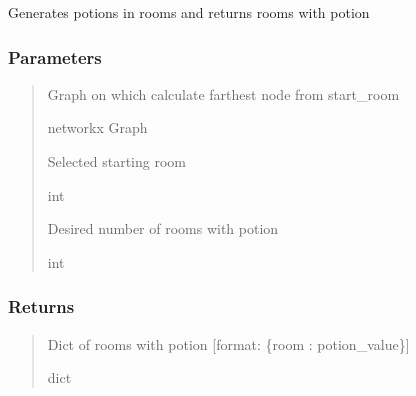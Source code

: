 \documentclass[letterpaper,10pt,english]{sphinxmanual}
\begin{document}
\begin{fulllineitems}
\label{\detokenize{api_reference/dungeon_resolver/generate_dungeon_problem:generate_dungeon_problem.generate_potions}}
\pysigstartsignatures
{}
\pysigstopsignatures
\sphinxAtStartPar
Generates potions in rooms and returns rooms with potion


\subsubsection{Parameters}
\label{\detokenize{api_reference/dungeon_resolver/generate_dungeon_problem:id9}}\begin{quote}\begin{description}
\sphinxAtStartPar
Graph on which calculate farthest node from start\_room

\sphinxAtStartPar
networkx Graph

\sphinxAtStartPar
Selected starting room

\sphinxAtStartPar
int

\sphinxAtStartPar
Desired number of rooms with potion

\sphinxAtStartPar
int

\end{description}\end{quote}


\subsubsection{Returns}
\label{\detokenize{api_reference/dungeon_resolver/generate_dungeon_problem:id10}}\begin{quote}\begin{description}
\sphinxAtStartPar
Dict of rooms with potion {[}format: \{room : potion\_value\}{]}

\sphinxAtStartPar
dict

\end{description}\end{quote}

\end{fulllineitems}
\end{document}
